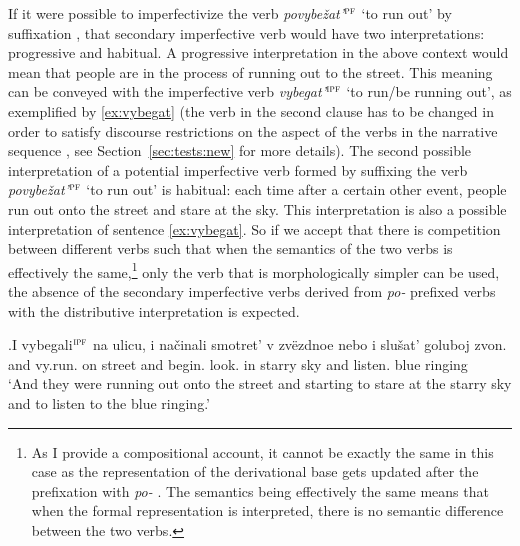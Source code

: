 If it were possible to imperfectivize the verb \textit{povybe\v{z}at'}$^{\textsc{pf}}$ `to run out'  by suffixation  , that secondary imperfective  verb  would have two interpretations: progressive and habitual. A progressive interpretation  in the above context   would mean that people are in the process of running out to the street. This meaning can be conveyed with the imperfective verb  \textit{vybegat'}$^{\textsc{ipf}}$ `to run/be running out', as exemplified by \ref{ex:vybegat} (the verb in the second clause has to be changed in order to satisfy discourse restrictions on the aspect of the verbs in the narrative sequence , see Section~\ref{sec:tests:new} for more details). The second possible interpretation of a potential imperfective verb  formed by suffixing the verb \textit{povybe\v{z}at'}$^{\textsc{pf}}$ `to run out' is habitual: each time after a certain other event, people run out onto the street and stare at the sky. This interpretation is also a possible interpretation of sentence \ref{ex:vybegat}. So if we accept that there is competition between different verbs such that when the semantics of the two verbs is effectively the same,\footnote{As I provide a compositional account, it cannot be exactly the same in this case as the representation of the derivational base gets updated after the prefixation  with \textit{po-}  . The semantics being effectively the same means that when the formal representation is interpreted, there is no semantic difference between the two verbs.} only the verb that is morphologically simpler can be used, the absence of the secondary imperfective  verbs  derived from \textit{po-}  prefixed verbs with the distributive  interpretation is expected.

\exg.\label{ex:vybegat}I vybegali$^{\textsc{ipf}}$ na ulicu, i na\v{c}inali smotret' v zv\"{e}zdnoe nebo i slu\v{s}at' goluboj zvon.\\
and vy.run. on street and begin. look. in starry sky and listen. blue ringing\\
\trans `And they were running out onto the street and starting to stare at the starry sky and to listen to the blue ringing.'

